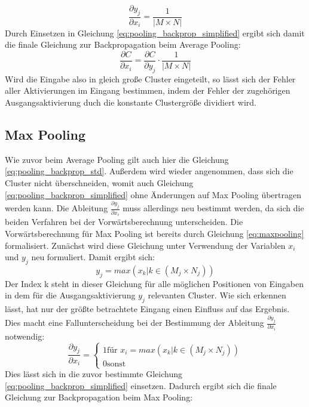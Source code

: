 \documentclass[../main.tex]{subfiles}
\begin{document}
\begin{equation}
\frac{\partial y_j}{\partial x_i} = \frac{1}{|M\times{N}|}
\end{equation}
Durch Einsetzen in Gleichung \ref{eq:pooling_backprop_simplified} ergibt sich damit die finale Gleichung zur Backpropagation beim Average Pooling: 
\begin{equation} \label{eq:pooling_backprop_avg_final}
\frac{\partial C}{\partial x_i} = \frac{\partial C}{\partial y_j} \cdot \frac{1}{|M\times{N}|}
\end{equation}
Wird die Eingabe also in gleich große Cluster eingeteilt, so lässt sich der Fehler aller Aktivierungen im Eingang bestimmen, indem der Fehler der zugehörigen Ausgangsaktivierung duch die konstante Clustergröße dividiert wird. 

\subsection{Max Pooling}
Wie zuvor beim Average Pooling gilt auch hier die Gleichung \ref{eq:pooling_backprop_std}. Außerdem wird wieder angenommen, dass sich die Cluster nicht überschneiden, womit auch Gleichung \ref{eq:pooling_backprop_simplified} ohne Änderungen auf Max Pooling übertragen werden kann. Die Ableitung \(\frac{\partial y_j}{\partial x_i}\) muss allerdings neu bestimmt werden, da sich die beiden Verfahren bei der Vorwärtsberechnung unterscheiden. 
Die Vorwärtsberechnung für Max Pooling ist bereits durch Gleichung \ref{eq:maxpooling} formalisiert. Zunächst wird diese Gleichung unter Verwendung der Variablen \(x_i\) und \(y_j\) neu formuliert. Damit ergibt sich: 
\begin{equation}
y_j = max( {x_k | k \in (M_j \times N_j)})
\end{equation}
Der Index k steht in dieser Gleichung für alle möglichen Positionen von Eingaben in dem für die Ausgangsaktivierung \(y_j\) relevanten Cluster. Wie sich erkennen lässt, hat nur der größte betrachtete Eingang einen Einfluss auf das Ergebnis. Dies macht eine Fallunterscheidung bei der Bestimmung der Ableitung \(\frac{\partial y_j}{\partial x_i}\) notwendig: 
\begin{equation}
   \frac{\partial y_j}{\partial x_i} = 
   \begin{cases}
     1 \text{für } x_i = max( {x_k | k \in (M_j \times N_j)}) \\
     0 \text{sonst}
   \end{cases}
\end{equation}
Dies lässt sich in die zuvor bestimmte Gleichung \ref{eq:pooling_backprop_simplified} einsetzen. Dadurch ergibt sich die finale Gleichung zur Backpropagation beim Max Pooling: 
\end{document}

